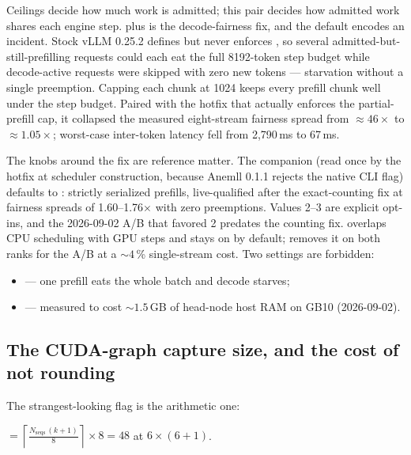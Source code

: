 Ceilings decide how much work is admitted; this pair decides how admitted
work shares each engine step.  plus
 is the 
decode-fairness fix, and the default encodes an incident. Stock vLLM 0.25.2
defines but never enforces , so several
admitted-but-still-prefilling requests could each eat the full 8192-token
step budget while decode-active requests were skipped with zero new tokens
--- starvation without a single preemption. Capping each chunk at 1024
keeps every prefill chunk well under the step budget. Paired with the
 hotfix that actually enforces the partial-prefill cap, it
collapsed the measured eight-stream fairness spread from ${\approx}46\times$
to ${\approx}1.05\times$; worst-case inter-token latency fell from
2{,}790\,ms to 67\,ms.

The knobs around the fix are reference matter. The companion
 (read once by the hotfix at scheduler
construction, because Anemll 0.1.1 rejects the native CLI flag) defaults to
: strictly serialized prefills, live-qualified after the
 exact-counting fix at fairness spreads of 1.60--1.76$\times$
with zero preemptions. Values 2--3 are explicit opt-ins, and the 2026-09-02
A/B that favored 2 predates the counting fix. 
overlaps CPU scheduling with GPU steps and stays on by default;
 removes it on both ranks for the
 A/B at a ${\sim}4$\,\% single-stream cost. Two settings are
forbidden:
\begin{itemize}
  \item {} --- one prefill eats the
    whole batch and decode starves;
  \item {} --- measured to cost
    ${\sim}1.5$\,GB of head-node host RAM on GB10 (2026-09-02).
\end{itemize}

\subsection{The CUDA-graph capture size, and the cost of not rounding}
\label{sec:profile-capture}

The strangest-looking flag is the arithmetic one:

\begin{center}
 $=\left\lceil \frac{N_{\mathrm{seqs}}\,(k+1)}{8} \right\rceil \times 8 = 48$ \quad at $6\times(6{+}1)$.
\end{center}

